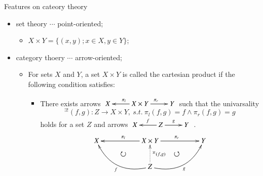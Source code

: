 \documentclass[dvipdfmx,10pt,notheorems]{beamer}
\renewcommand{\#}{^\sharp}
\begin{document}
	\begin{frame}{Features on cateory theory}
			\begin{itemize}
					\item set theory $\cdots$ point-oriented;
							\begin{itemize}
									\item $X\times Y=\{(x,y);x\in X, y\in Y\}$;
							\end{itemize}
					\item category thoery $\cdots$ arrow-oriented;
							\begin{itemize}
									\item For sets $X$ and $Y$, a set $X\times Y$ is called
									the cartesian product if the following condition satisfies:
											\begin{itemize}
													\item There exists arrows
														$
														\xymatrix{
														X
														& X\times Y
														\ar[l]_{\pi_l}
														\ar[r]^{\pi_r}
														& Y
														}
														$
													such that the univarsality
														\begin{equation*}
														^{\exists!}(f,g):Z\rightarrow
														X\times Y,~s.t.~\pi_l(f,g)=f \wedge \pi_r(f,g)=g
														\end{equation*}
													holds for a set $Z$ and arrows
														$
														\xymatrix{
														X
														& Z
														\ar[l]_{f}
														\ar[r]^{g}
														& Y
														}
														$
													.
													\begin{equation*}
														\begin{gathered}
															\xymatrix{
															X
															\ar@{}[drr]|{\rotatebox{0}{$\circlearrowright$}}
															&&
															X\times Y
															\ar[ll]_{\pi_l}
															\ar[rr]^{\pi_r}
															&&
															Y
															\ar@{}[dll]|{\rotatebox{0}{$\circlearrowleft$}}
															\\
															&&
															Z
															\ar@{.>}[u]_{^{\exists!}(f,g)}
															\ar@/^18pt/[ull]^{f}
															\ar@/_18pt/[urr]_{g}
															&&
															}
														\end{gathered}
													\end{equation*}
								\end{itemize}
						\end{itemize}
			\end{itemize}
	\end{frame}
\end{document}
